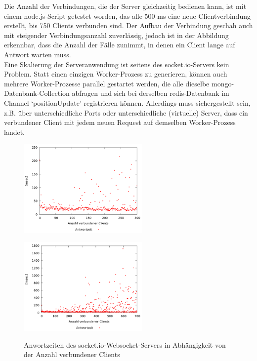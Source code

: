Die Anzahl der Verbindungen, die der Server gleichzeitig bedienen kann, ist mit einem node.js-Script getestet worden, das alle 500 ms eine neue Clientverbindung erstellt, bis 750 Clients verbunden sind. Der Aufbau der Verbindung geschah auch mit steigender Verbindungsanzahl zuverlässig, jedoch ist in der Abbildung erkennbar, dass die Anzahl der Fälle zunimmt, in denen ein Client lange auf Antwort warten muss.
\\Eine Skalierung der Serveranwendung ist seitens des socket.io-Servers kein Problem. Statt einen einzigen Worker-Prozess zu generieren, können auch mehrere Worker-Prozesse parallel gestartet werden, die alle dieselbe mongo-Datenbank-Collection abfragen und sich bei derselben redis-Datenbank im Channel ‘positionUpdate’ registrieren können. Allerdings muss sichergestellt sein, z.B.  über unterschiedliche Ports oder unterschiedliche (virtuelle) Server, dass ein verbundener Client mit jedem neuen Request auf demselben Worker-Prozess landet.

\begin{figure}[H]
\begin{minipage}[hbt]{3in}
	\centering
	\includegraphics[width=2.5in]{images/stresstest300.png}
	\label{Stresstest300}
\end{minipage}
\hfill
\begin{minipage}[hbt]{3in}
	\centering
	\includegraphics[width=2.5in]{images/stresstest.png}
	\label{Stresstest}
\end{minipage}
\caption{Anwortzeiten des socket.io-Websocket-Servers in Abhängigkeit von der Anzahl verbundener Clients}
\end{figure}
